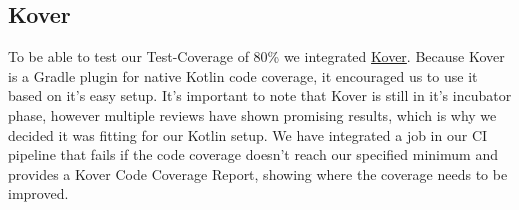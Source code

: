 \subsection{Kover}
To be able to test our Test-Coverage of 80\% we integrated \href{https://github.com/Kotlin/kotlinx-kover}{Kover}.
Because Kover is a Gradle plugin for native Kotlin code coverage, it encouraged us to use it based on it's easy setup.
It's important to note that Kover is still in it's incubator phase, however multiple reviews have shown promising results, which is why we decided it was fitting for our Kotlin setup.
We have integrated a job in our CI pipeline that fails if the code coverage doesn't reach our specified minimum and provides a Kover Code Coverage Report, showing where the coverage needs to be improved.
